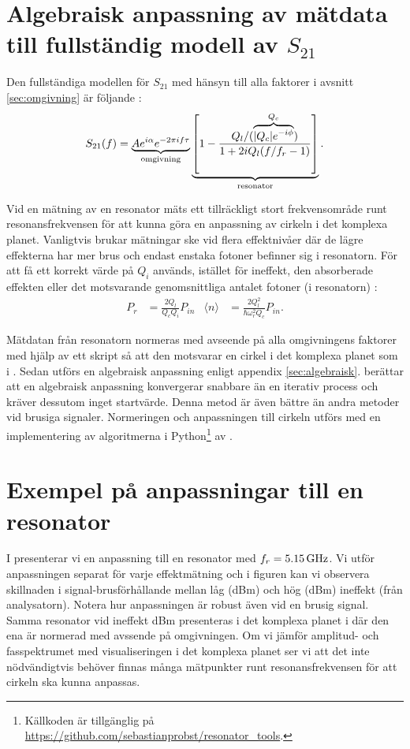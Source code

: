 \documentclass[main.tex]{subfiles}
\begin{document}
\section{Algebraisk anpassning av mätdata till fullständig modell av $S_{21}$}
Den fullständiga modellen för $S_{21}$ med hänsyn till alla faktorer i avsnitt \ref{sec:omgivning} är följande \cite{Probst2015}:
\begin{equation}
    S_{21}(f)=\underbrace{A e^{i\alpha}e^{-2\pi i f\tau}}_\text{omgivning}\underbrace{\qty[1-\frac{Q_l/(\overbrace{|Q_c|e^{-i\phi}}^{Q_c})}{1+2iQ_l\qty(f/f_r-1)}]}_\text{resonator}.
\label{eq:S21}
\end{equation}

Vid en mätning av en resonator mäts ett tillräckligt stort frekvensområde runt resonansfrekvensen för att kunna göra en anpassning av cirkeln i det komplexa planet. Vanligtvis brukar mätningar ske vid flera effektnivåer där de lägre effekterna har mer brus och endast enstaka fotoner befinner sig i resonatorn. För att få ett korrekt värde på $Q_i$ används, istället för ineffekt, den absorberade effekten eller det motsvarande genomsnittliga antalet fotoner (i resonatorn) \cite{Boehme2016}:
\begin{align}
    P_r&=\frac{2Q_l}{Q_cQ_i}P_{in}
    &
    \langle n \rangle &=\frac{2Q^2_l}{\hbar \omega^2_r Q_c}P_{in}.
\end{align}

Mätdatan från resonatorn normeras med avseende på alla omgivningens faktorer med hjälp av ett skript så att den motsvarar en cirkel i det komplexa planet som i . Sedan utförs en algebraisk anpassning enligt appendix \ref{sec:algebraisk}. \citeauthor{Probst2015} \cite{Probst2015} berättar att en algebraisk anpassning konvergerar snabbare än en iterativ process och kräver dessutom inget startvärde. Denna metod är även bättre än andra metoder vid brusiga signaler. Normeringen och anpassningen till cirkeln utförs med en implementering av algoritmerna i Python\footnote{Källkoden är tillgänglig på \url{https://github.com/sebastianprobst/resonator_tools}.} av \citeauthor{Probst2015}.

\section{Exempel på anpassningar till en resonator}
I  presenterar vi en anpassning till en resonator med $f_r=\unit[5.15]{GHz}$.
Vi utför anpassningen separat för varje effektmätning och i figuren kan vi observera skillnaden i signal-brusförhållande mellan låg (\unit[-90]{dBm}) och hög  (\unit[-40]{dBm}) ineffekt (från analysatorn).
Notera hur anpassningen är robust även vid en brusig signal. Samma resonator vid ineffekt \unit[-80]{dBm} presenteras i det komplexa planet i  där den ena är normerad med avssende på omgivningen. 
Om vi jämför amplitud- och fasspektrumet med visualiseringen i det komplexa planet ser vi att det inte nödvändigtvis behöver finnas många mätpunkter runt resonansfrekvensen för att cirkeln ska kunna anpassas.
\end{document}
